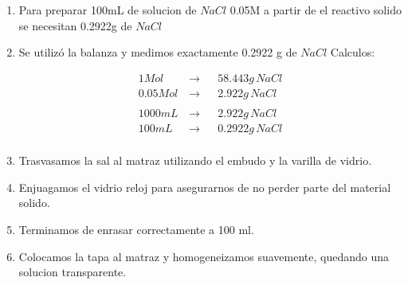 \documentclass[12pt,a4paper]{report}
\begin{document}
\chapter{}

\begin{enumerate}[label=\alph*]
  \item Para preparar 100mL de solucion de $NaCl$ 0.05M a partir de el reactivo solido se necesitan 0.2922g de $NaCl$

  \item Se utilizó la balanza y medimos exactamente 0.2922 g de $NaCl$
  Calculos:

      $$
\begin{aligned}
   1 Mol  \, &\rightarrow&& 58.443g \,NaCl\\[6pt]
   0.05 Mol  \, &\rightarrow&& 2.922g \,NaCl\\[6pt]
    \\
   1000mL \,  &\rightarrow&& 2.922g \,NaCl\\[6pt]
    100mL\,  &\rightarrow&& 0.2922g \,NaCl\\[6pt]
\end{aligned}
$$

  \item Trasvasamos la sal al matraz utilizando el embudo y la varilla de vidrio.

  \item Enjuagamos el vidrio reloj para asegurarnos de no perder parte del material solido.

  \item Terminamos de enrasar correctamente a 100 ml.

  \item Colocamos la tapa al matraz y homogeneizamos suavemente, quedando una solucion transparente.
\end{enumerate}
\end{document}
